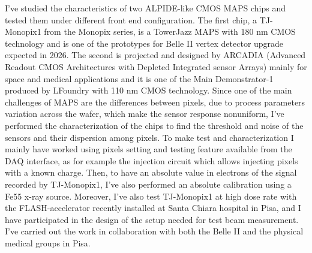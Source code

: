 \documentclass[a4paper]{report}
\begin{document}
I've studied the characteristics of two ALPIDE-like CMOS MAPS chips and tested them under different front end configuration. The first chip, a TJ-Monopix1 from the Monopix series, is a TowerJazz MAPS with 180 nm CMOS technology and is one of the prototypes for Belle II vertex detector upgrade expected in 2026. The second is projected and designed by ARCADIA (Advanced Readout CMOS Architectures with Depleted Integrated sensor Arrays) mainly  for space and medical applications and it is one of the Main Demonstrator-1 produced by LFoundry with 110 nm CMOS technology. 
Since one of the main challenges of MAPS are the differences between pixels, due to process parameters variation across the wafer, which make the sensor response nonuniform, I've performed the characterization of the chips to find the threshold and noise of the sensors and their dispersion among pixels. To make test and characterization I mainly have worked using pixels setting and testing feature available from the DAQ interface, as for example the injection circuit which allows injecting pixels with a known charge. Then, to have an absolute value in electrons of the signal recorded by TJ-Monopix1, I've also performed an absolute calibration using a Fe55 x-ray source. 
Moreover, I've also test TJ-Monopix1 at high dose rate with the FLASH-accelerator recently installed at Santa Chiara hospital in Pisa, and I have participated in the design of the setup needed for test beam measurement.
I've carried out the work in collaboration with both the Belle II and the physical medical groups in Pisa.
\end{document}
